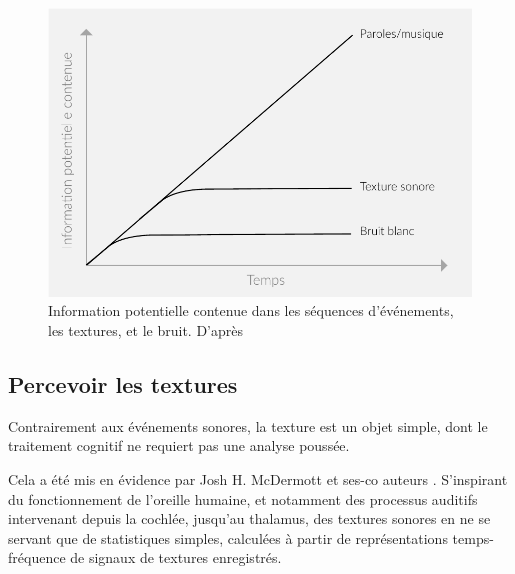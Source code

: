 
\begin{figure}[t]
        \myfloatalign
        \includegraphics[width=.8\linewidth]{gfx/texture}
        \caption[Information potentielle contenue dans les séquences d'événements, les textures, et le bruit]{Information potentielle contenue dans les séquences d'événements, les textures, et le bruit. D'après \citep{saint1995classification}}\label{fig:texture}
\end{figure}

\subsection{Percevoir les textures}

Contrairement aux événements sonores, la texture est un objet simple, dont le traitement cognitif ne requiert pas une analyse poussée. 

Cela a été mis en évidence par Josh H. McDermott et ses-co auteurs \citep{mcdermott2011sound,mcdermott2013summary}. S'inspirant du fonctionnement de l'oreille humaine, et notamment des processus auditifs intervenant depuis la cochlée, jusqu'au thalamus,  des textures sonores en ne se servant que de statistiques simples, calculées à partir de représentations temps-fréquence de signaux de textures enregistrés. 

